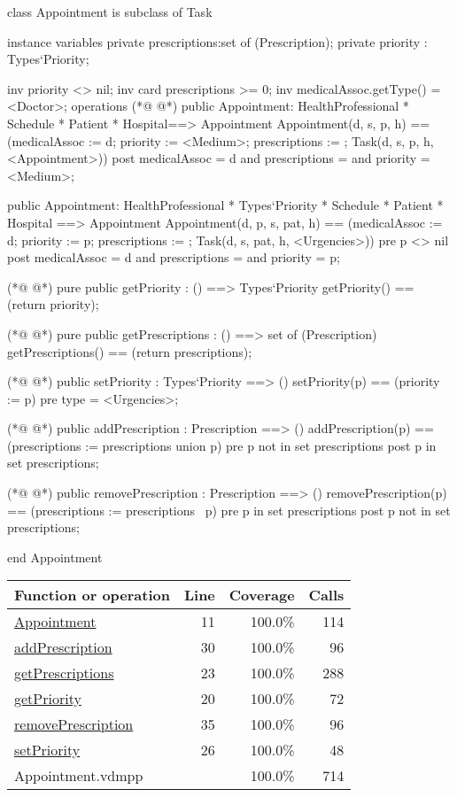 \begin{vdmpp}[breaklines=true]
class Appointment is subclass of Task

instance variables
  private prescriptions:set of (Prescription);
  private priority : Types`Priority;
  
  inv priority <> nil;
  inv card prescriptions >= 0;
  inv medicalAssoc.getType() = <Doctor>;
operations
(*@
\label{Appointment:11}
@*)
 public Appointment: HealthProfessional * Schedule * Patient * Hospital==> Appointment
  Appointment(d, s, p, h) == (medicalAssoc := d; priority := <Medium>; prescriptions := {}; Task(d, s, p, h, <Appointment>))
 post medicalAssoc = d and prescriptions = {} and priority = <Medium>;
 
 public Appointment: HealthProfessional * Types`Priority * Schedule * Patient * Hospital ==> Appointment
  Appointment(d, p, s, pat, h) == (medicalAssoc := d; priority := p; prescriptions := {}; Task(d, s, pat, h, <Urgencies>))
 pre p <> nil
 post medicalAssoc = d and prescriptions = {} and priority = p;

(*@
\label{getPriority:20}
@*)
 pure public getPriority : () ==> Types`Priority
  getPriority() == (return priority);
 
(*@
\label{getPrescriptions:23}
@*)
  pure public getPrescriptions : () ==> set of (Prescription)
   getPrescriptions() == (return prescriptions);
  
(*@
\label{setPriority:26}
@*)
  public setPriority : Types`Priority ==> ()
   setPriority(p) == (priority := p)
  pre type = <Urgencies>;
  
(*@
\label{addPrescription:30}
@*)
  public addPrescription : Prescription ==> ()
   addPrescription(p) == (prescriptions := prescriptions union {p})
  pre p not in set prescriptions
  post p in set prescriptions;
                 
(*@
\label{removePrescription:35}
@*)
 public removePrescription : Prescription ==> ()
   removePrescription(p) == (prescriptions := prescriptions \ {p})
  pre p in set prescriptions
  post p not in set prescriptions;
   
end Appointment
\end{vdmpp}
\bigskip
\begin{longtable}{|l|r|r|r|}
\hline
Function or operation & Line & Coverage & Calls \\
\hline
\hline
\hyperref[Appointment:11]{Appointment} & 11&100.0\% & 114 \\
\hline
\hyperref[addPrescription:30]{addPrescription} & 30&100.0\% & 96 \\
\hline
\hyperref[getPrescriptions:23]{getPrescriptions} & 23&100.0\% & 288 \\
\hline
\hyperref[getPriority:20]{getPriority} & 20&100.0\% & 72 \\
\hline
\hyperref[removePrescription:35]{removePrescription} & 35&100.0\% & 96 \\
\hline
\hyperref[setPriority:26]{setPriority} & 26&100.0\% & 48 \\
\hline
\hline
Appointment.vdmpp & & 100.0\% & 714 \\
\hline
\end{longtable}

